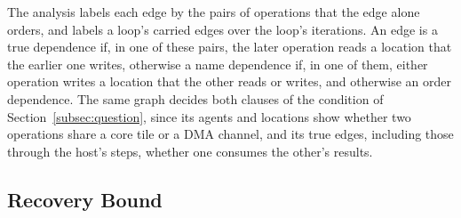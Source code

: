 The analysis labels each edge by the pairs of operations that the edge alone orders, and labels a loop's carried edges over the loop's iterations.
An edge is a true dependence if, in one of these pairs, the later operation reads a location that the earlier one writes, otherwise a name dependence if, in one of them, either operation writes a location that the other reads or writes, and otherwise an order dependence.
The same graph decides both clauses of the condition of Section~\ref{subsec:question}, since its agents and locations show whether two operations share a core tile or a DMA channel, and its true edges, including those through the host's steps, whether one consumes the other's results.

\subsection{Recovery Bound}
\label{subsec:removal}

